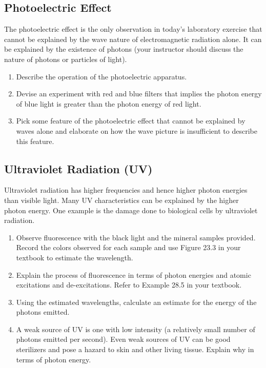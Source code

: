 \subsection {Photoelectric Effect}	
The photoelectric effect is the only observation in today's laboratory exercise that cannot be explained by the wave nature of electromagnetic radiation alone.  It can be explained by the existence of photons (your instructor should discuss the nature of photons or particles of light).
\begin{enumerate}
	\item Describe the operation of the photoelectric apparatus.
	\item Devise an experiment with red and blue filters that implies the photon energy of blue light is greater than the photon energy of red light.
	\item Pick some feature of the photoelectric effect that cannot be explained by waves alone and elaborate on how the wave picture is insufficient to describe this feature.
\end{enumerate}

	
\subsection {Ultraviolet Radiation (UV)}
 Ultraviolet radiation has higher frequencies and hence higher photon energies than visible light.  Many UV characteristics can be explained by the higher photon energy.  One example is the damage done to biological cells by ultraviolet radiation.
 \begin{enumerate}
	\item Observe fluorescence with the black light and the mineral samples provided.  Record the colors observed for each sample and use Figure 23.3 in your textbook to estimate the wavelength.
	\item Explain the process of fluorescence in terms of photon energies and atomic excitations and de-excitations.  Refer to Example 28.5 in your textbook.
	\item Using the estimated wavelengths, calculate an estimate for the energy of the photons emitted. 
	\item A weak source of UV is one with low intensity (a relatively small number of photons emitted per second).  Even weak sources of UV can be good sterilizers and pose a hazard to skin and other living tissue.  Explain why in terms of photon energy.
\end{enumerate}
	
